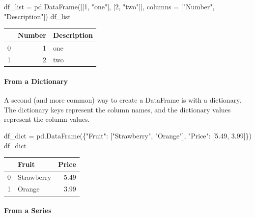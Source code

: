 \documentclass[
  letterpaper,
  DIV=11,
  numbers=noendperiod]{scrreprt}
\let\oldparagraph\paragraph
\renewcommand{\paragraph}[1]{\oldparagraph{#1}\mbox{}}
\newenvironment{Shaded}{\begin{snugshade}}{\end{snugshade}}
\newcommand{\DecValTok}[1]{\textcolor[rgb]{0.68,0.00,0.00}{#1}}
\newcommand{\FloatTok}[1]{\textcolor[rgb]{0.68,0.00,0.00}{#1}}
\newcommand{\NormalTok}[1]{\textcolor[rgb]{0.00,0.23,0.31}{#1}}
\newcommand{\OperatorTok}[1]{\textcolor[rgb]{0.37,0.37,0.37}{#1}}
\newcommand{\StringTok}[1]{\textcolor[rgb]{0.13,0.47,0.30}{#1}}
\begin{document}
\begin{Shaded}
\begin{Highlighting}[]
\NormalTok{df\_list }\OperatorTok{=}\NormalTok{ pd.DataFrame([[}\DecValTok{1}\NormalTok{, }\StringTok{"one"}\NormalTok{], [}\DecValTok{2}\NormalTok{, }\StringTok{"two"}\NormalTok{]], columns }\OperatorTok{=}\NormalTok{ [}\StringTok{"Number"}\NormalTok{, }\StringTok{"Description"}\NormalTok{])}
\NormalTok{df\_list}
\end{Highlighting}
\end{Shaded}

\begin{tabular}{lrl}
\toprule
{} &  Number & Description \\
\midrule
0 &       1 &         one \\
1 &       2 &         two \\
\bottomrule
\end{tabular}

\hypertarget{from-a-dictionary}{%
\paragraph{From a Dictionary}\label{from-a-dictionary}}

A second (and more common) way to create a DataFrame is with a
dictionary. The dictionary keys represent the column names, and the
dictionary values represent the column values.

\begin{Shaded}
\begin{Highlighting}[]
\NormalTok{df\_dict }\OperatorTok{=}\NormalTok{ pd.DataFrame(\{}\StringTok{"Fruit"}\NormalTok{: [}\StringTok{"Strawberry"}\NormalTok{, }\StringTok{"Orange"}\NormalTok{], }\StringTok{"Price"}\NormalTok{: [}\FloatTok{5.49}\NormalTok{, }\FloatTok{3.99}\NormalTok{]\})}
\NormalTok{df\_dict}
\end{Highlighting}
\end{Shaded}

\begin{tabular}{llr}
\toprule
{} &       Fruit &  Price \\
\midrule
0 &  Strawberry &   5.49 \\
1 &      Orange &   3.99 \\
\bottomrule
\end{tabular}

\hypertarget{from-a-series}{%
\paragraph{From a Series}\label{from-a-series}}
\end{document}
